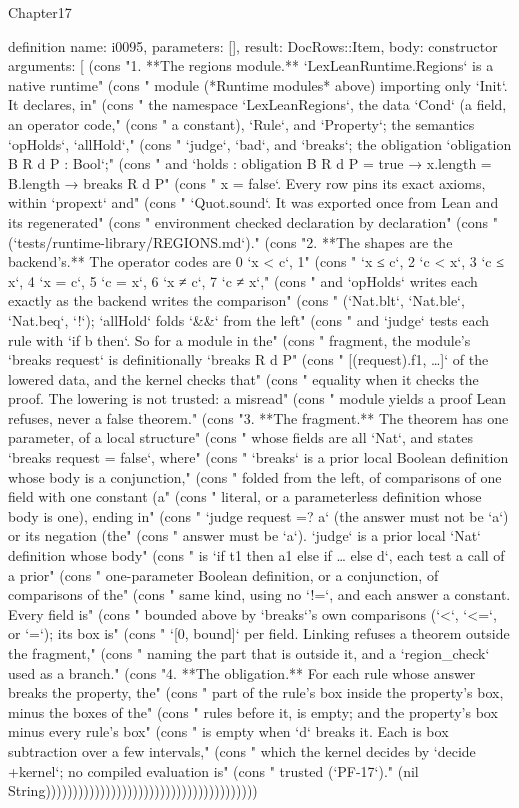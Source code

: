\begin{lexlean}{Chapter17}
\begin{semanticmodule}
definition{
  name: i0095,
  parameters: [],
  result: DocRows::Item,
  body: constructor{
    arguments: [
      (cons "1. **The regions module.** `LexLeanRuntime.Regions` is a native runtime" (cons "   module (*Runtime modules* above) importing only `Init`. It declares, in" (cons "   the namespace `LexLeanRegions`, the data `Cond` (a field, an operator code," (cons "   a constant), `Rule`, and `Property`; the semantics `opHolds`, `allHold`," (cons "   `judge`, `bad`, and `breaks`; the obligation `obligation B R d P : Bool`;" (cons "   and `holds : obligation B R d P = true → x.length = B.length → breaks R d P" (cons "   x = false`. Every row pins its exact axioms, within `propext` and" (cons "   `Quot.sound`. It was exported once from Lean and its regenerated" (cons "   environment checked declaration by declaration" (cons "   (`tests/runtime-library/REGIONS.md`)." (cons "2. **The shapes are the backend's.** The operator codes are 0 `x < c`, 1" (cons "   `x ≤ c`, 2 `c < x`, 3 `c ≤ x`, 4 `x = c`, 5 `c = x`, 6 `x ≠ c`, 7 `c ≠ x`," (cons "   and `opHolds` writes each exactly as the backend writes the comparison" (cons "   (`Nat.blt`, `Nat.ble`, `Nat.beq`, `!`); `allHold` folds `&&` from the left" (cons "   and `judge` tests each rule with `if b then`. So for a module in the" (cons "   fragment, the module's `breaks request` is definitionally `breaks R d P" (cons "   [(request).f1, …]` of the lowered data, and the kernel checks that" (cons "   equality when it checks the proof. The lowering is not trusted: a misread" (cons "   module yields a proof Lean refuses, never a false theorem." (cons "3. **The fragment.** The theorem has one parameter, of a local structure" (cons "   whose fields are all `Nat`, and states `breaks request = false`, where" (cons "   `breaks` is a prior local Boolean definition whose body is a conjunction," (cons "   folded from the left, of comparisons of one field with one constant (a" (cons "   literal, or a parameterless definition whose body is one), ending in" (cons "   `judge request =? a` (the answer must not be `a`) or its negation (the" (cons "   answer must be `a`). `judge` is a prior local `Nat` definition whose body" (cons "   is `if t1 then a1 else if … else d`, each test a call of a prior" (cons "   one-parameter Boolean definition, or a conjunction, of comparisons of the" (cons "   same kind, using no `!=`, and each answer a constant. Every field is" (cons "   bounded above by `breaks`'s own comparisons (`<`, `<=`, or `=`); its box is" (cons "   `[0, bound]` per field. Linking refuses a theorem outside the fragment," (cons "   naming the part that is outside it, and a `region_check` used as a branch." (cons "4. **The obligation.** For each rule whose answer breaks the property, the" (cons "   part of the rule's box inside the property's box, minus the boxes of the" (cons "   rules before it, is empty; and the property's box minus every rule's box" (cons "   is empty when `d` breaks it. Each is box subtraction over a few intervals," (cons "   which the kernel decides by `decide +kernel`; no compiled evaluation is" (cons "   trusted (`PF-17`)." (nil String)))))))))))))))))))))))))))))))))))))))
}}
\end{semanticmodule}
\end{lexlean}
